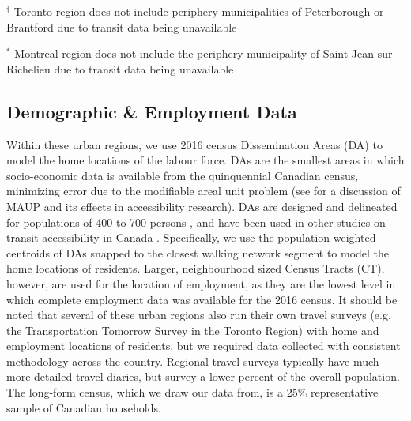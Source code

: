 \documentclass[11 pt, letterpaper]{article}
\begin{document}
{\begin{table}
\begin{adjustwidth}{-.25in}{-.25in}
\begin{singlespace}
\begin{tabular}{L{19mm}L{10mm}L{17mm}L{33mm}L{60mm}}
		\end{tabular}
	\end{singlespace}
	\end{adjustwidth}
	\vspace{-6mm}
	\begin{flushleft}
	\singlespacing\small{
		$^\dagger$ Toronto region does not include periphery municipalities of Peterborough or Brantford due to transit data being unavailable
		
		$^*$  Montreal region does not include the periphery municipality of Saint-Jean-sur-Richelieu due to transit data being unavailable
		
		
	}
	
	\end{flushleft}

\end{table}

\subsection{Demographic \& Employment Data}

Within these urban regions, we use 2016 census Dissemination Areas (DA) to model the home locations of the labour force. DAs are the smallest areas in which socio-economic data is available from the quinquennial Canadian census, minimizing error due to the modifiable areal unit problem (see  for a discussion of MAUP and its effects in accessibility research). DAs are designed and delineated for populations of 400 to 700 persons \cite{sc2016cdic}, and have been used in other studies on transit accessibility in Canada \cite{widener2017,wessel2017}. Specifically, we use the population weighted centroids of DAs snapped to the closest walking network segment to model the home locations of residents. Larger, neighbourhood sized Census Tracts (CT), however, are used for the location of employment, as they are the lowest level in which complete employment data was available for the 2016 census. It should be noted that several of these urban regions also run their own travel surveys (e.g. the Transportation Tomorrow Survey in the Toronto Region) with home and employment locations of residents, but we required data collected with consistent methodology across the country. Regional travel surveys typically have much more detailed travel diaries, but survey a lower percent of the overall population. The long-form census, which we draw our data from, is a 25\% representative sample of Canadian households. 

}
\end{document}
